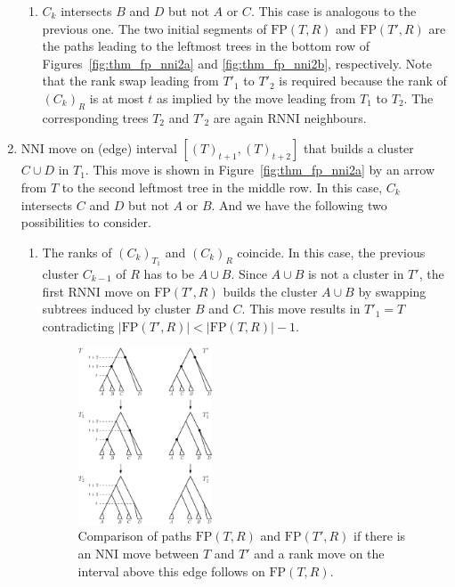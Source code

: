\documentclass[11pt]{amsart}
\newcommand{\rnni}{\mathrm{RNNI}}
\newcommand{\nni}{\mathrm{NNI}}
\newcommand{\fp}{\mathrm{FP}}
\begin{document}
\begin{enumerate}[label = 1.{\arabic*}]
\begin{enumerate}[label = \theenumi.\arabic*]
\item $C_k$ intersects $B$ and $D$ but not $A$ or $C$.
This case is analogous to the previous one.
The two initial segments of $\fp(T, R)$ and $\fp(T', R)$ are the paths leading to the leftmost trees in the bottom row of Figures~\ref{fig:thm_fp_nni2a} and \ref{fig:thm_fp_nni2b}, respectively.
Note that the rank swap leading from $T'_1$ to $T'_2$ is required because the rank of $(C_k)_R$ is at most $t$ as implied by the move leading from $T_1$ to $T_2$.
The corresponding trees $T_2$ and $T'_2$ are again $\rnni$ neighbours.
\end{enumerate}

\item $\nni$ move on (edge) interval $[(T)_{t+1}, (T)_{t+2}]$ that builds a cluster $C \cup D$ in $T_1$.
\label{case:one_or_two_moves_down}
This move is shown in Figure~\ref{fig:thm_fp_nni2a} by an arrow from $T$ to the second leftmost tree in the middle row.
In this case, $C_k$ intersects $C$ and $D$ but not $A$ or $B$.
And we have the following two possibilities to consider.

\begin{enumerate}[label = \theenumi.\arabic*]
\item The ranks of $(C_k)_{T_1}$ and $(C_k)_R$ coincide.
In this case, the previous cluster $C_{k-1}$ of $R$ has to be $A \cup B$.
Since $A \cup B$ is not a cluster in $T'$, the first $\rnni$ move on $\fp(T', R)$ builds the cluster $A \cup B$ by swapping subtrees induced by cluster $B$ and $C$.
This move results in $T'_1 = T$ contradicting $|\fp(T',R)| < |\fp(T,R)| - 1$.

\begin{figure}[ht]
	\centering
	\includegraphics[width=0.4\textwidth]{thm_fp_nni3}
	\caption{Comparison of paths $\fp(T, R)$ and $\fp(T', R)$ if there is an $\nni$ move between $T$ and $T'$ and a rank move on the interval above this edge follows on $\fp(T, R)$.}
	\label{fig:thm_fp_nni3}
\end{figure}


\end{enumerate}
\end{enumerate}
\end{document}
